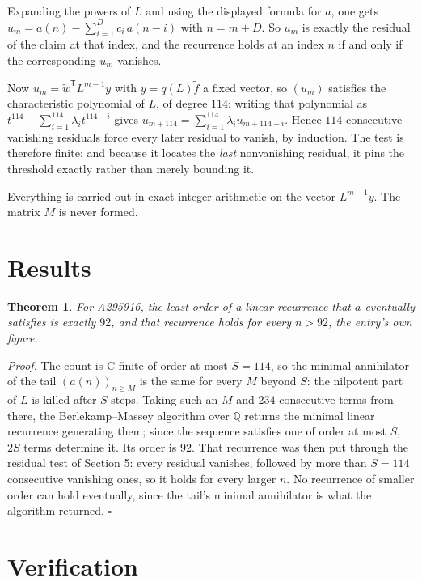 \documentclass[11pt]{article}
\newtheorem{theorem}{Theorem}
\theoremstyle{definition}
\begin{document}
Expanding the powers of $L$ and using the displayed formula for $a$, one gets $u_m = a(n) - \sum_{i=1}^{D} c_i\,a(n-i)$ with $n = m + D$. So $u_m$ is exactly the residual of the claim at that index, and the recurrence holds at an index $n$ if and only if the corresponding $u_m$ vanishes.

Now $u_m = \tilde w^{\mathsf T} L^{m-1} y$ with $y = q(L)\tilde f$ a fixed vector, so $(u_m)$ satisfies the characteristic polynomial of $L$, of degree $114$: writing that polynomial as $t^{114} - \sum_{i=1}^{114} \lambda_i t^{114-i}$ gives $u_{m+114} = \sum_{i=1}^{114} \lambda_i u_{m+114-i}$. Hence $114$ consecutive vanishing residuals force every later residual to vanish, by induction. The test is therefore finite; and because it locates the {\itshape last} nonvanishing residual, it pins the threshold exactly rather than merely bounding it.

Everything is carried out in exact integer arithmetic on the vector $L^{m-1}y$. The matrix $M$ is never formed.

\section{Results}

\begin{theorem} For A295916, the least order of a linear recurrence that $a$ eventually satisfies is exactly $92$, and that recurrence holds for every $n > 92$, the entry's own figure.\end{theorem}

{\itshape Proof.} The count is C-finite of order at most $S = 114$, so the minimal annihilator of the tail $(a(n))_{n \ge M}$ is the same for every $M$ beyond $S$: the nilpotent part of $L$ is killed after $S$ steps. Taking such an $M$ and $234$ consecutive terms from there, the Berlekamp--Massey algorithm over $\mathbb{Q}$ returns the minimal linear recurrence generating them; since the sequence satisfies one of order at most $S$, $2S$ terms determine it. Its order is $92$. That recurrence was then put through the residual test of Section 5: every residual vanishes, followed by more than $S = 114$ consecutive vanishing ones, so it holds for every larger $n$. No recurrence of smaller order can hold eventually, since the tail's minimal annihilator is what the algorithm returned. $\square$

\section{Verification}
\end{document}
